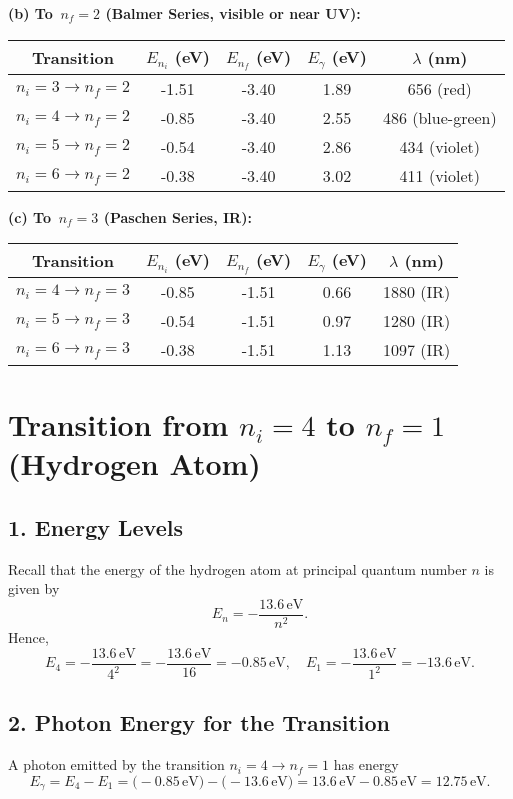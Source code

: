 \documentclass[12pt]{article}
\theoremstyle{definition} %
\theoremstyle{plain} %
\begin{document}
\noindent
\textbf{(b) To \(\,n_f = 2\) (Balmer Series, visible or near UV):}

\begin{tabular}{|c|c|c|c|c|}
\hline
Transition & $E_{n_i}$ (eV) & $E_{n_f}$ (eV) & $E_\gamma$ (eV) & $\lambda$ (nm) \\ \hline
$n_i=3 \to n_f=2$ & -1.51 & -3.40 & 1.89 & 656 (red) \\ \hline
$n_i=4 \to n_f=2$ & -0.85 & -3.40 & 2.55 & 486 (blue-green) \\ \hline
$n_i=5 \to n_f=2$ & -0.54 & -3.40 & 2.86 & 434 (violet) \\ \hline
$n_i=6 \to n_f=2$ & -0.38 & -3.40 & 3.02 & 411 (violet) \\ \hline
\end{tabular}

\vspace{0.5cm}

\noindent
\textbf{(c) To \(\,n_f = 3\) (Paschen Series, IR):}

\begin{tabular}{|c|c|c|c|c|}
\hline
Transition & $E_{n_i}$ (eV) & $E_{n_f}$ (eV) & $E_\gamma$ (eV) & $\lambda$ (nm) \\ \hline
$n_i=4 \to n_f=3$ & -0.85 & -1.51 & 0.66 & 1880 (IR) \\ \hline
$n_i=5 \to n_f=3$ & -0.54 & -1.51 & 0.97 & 1280 (IR) \\ \hline
$n_i=6 \to n_f=3$ & -0.38 & -1.51 & 1.13 & 1097 (IR) \\ \hline
\end{tabular}


\section*{Transition from \(n_i=4\) to \(n_f=1\) (Hydrogen Atom)}

\subsection*{1. Energy Levels}
Recall that the energy of the hydrogen atom at principal quantum number \(n\) is given by
\[
E_n = -\frac{13.6\,\text{eV}}{n^2}.
\]
Hence,
\[
E_4 = -\frac{13.6\,\text{eV}}{4^2} = -\frac{13.6\,\text{eV}}{16} = -0.85\,\text{eV},
\quad
E_1 = -\frac{13.6\,\text{eV}}{1^2} = -13.6\,\text{eV}.
\]

\subsection*{2. Photon Energy for the Transition}
A photon emitted by the transition \(n_i = 4 \to n_f = 1\) has energy
\[
E_{\gamma} = E_{4} - E_{1}
= \bigl(-0.85\,\text{eV}\bigr) - \bigl(-13.6\,\text{eV}\bigr)
= 13.6\,\text{eV} - 0.85\,\text{eV}
= 12.75\,\text{eV}.
\]
\end{document}
